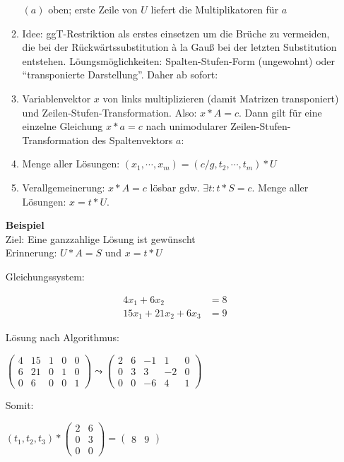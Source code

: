 \begin{enumerate}
\begin{enumerate}
    $(a)$ oben; erste Zeile von $U$ liefert die Multiplikatoren für $a$
  \item Idee: ggT-Restriktion als erstes einsetzen um die Brüche zu
    vermeiden, die bei der Rückwärtssubstitution \`a la Gauß bei der
    letzten Substitution entstehen. Löungsmöglichkeiten:
    Spalten-Stufen-Form (ungewohnt) oder ``transponierte
    Darstellung''. Daher ab sofort:
  \item Variablenvektor $x$ von links multiplizieren (damit Matrizen
    transponiert) und Zeilen-Stufen-Transfor\-mation.  Also: $x*A =
    c$. Dann gilt für eine einzelne Gleichung $x*a=c$ nach unimodularer
    Zeilen-Stufen-Transforma\-tion des Spaltenvektors $a$:
  \item Menge aller Lösungen: $(x_1,\cdots,x_m) = (c/g,t_2,\cdots,t_m)*
    U$
  \item Verallgemeinerung: $x*A = c$ lösbar gdw. $\exists t: t*S =
    c$. Menge aller Lösungen: $x = t*U$.
  \end{enumerate}

\textbf{Beispiel}\\
Ziel: Eine ganzzahlige Lösung ist gewünscht \\
Erinnerung: $U*A = S$ und $x = t*U$

Gleichungssystem:

\begin{align*}
 4x_1 +  6x_2        &= 8 \\
15x_1 + 21x_2 + 6x_3 &= 9
\end{align*}

Lösung nach Algorithmus:

$\left( 
\begin{array}{cc|ccc}
4 & 15 & 1 & 0 & 0\\ 
6 & 21 & 0 & 1 & 0\\ 
0 & 6  & 0 & 0 & 1%
\end{array}%
\right) \leadsto \left( 
\begin{array}{cc|ccc}
2 & 6 & -1 &  1 & 0\\ 
0 & 3 &  3 & -2 & 0\\ 
0 & 0 & -6 &  4 & 1%
\end{array}%
\right) $

Somit:

$\left(
t_1, t_2, t_3
\right) *
\left(
\begin{array}{cc}
2 & 6 \\
0 & 3 \\
0 & 0%
\end{array}
\right)
= 
\left(
\begin{array}{cc}
8 & 9
\end{array}
\right)$


\end{enumerate}
